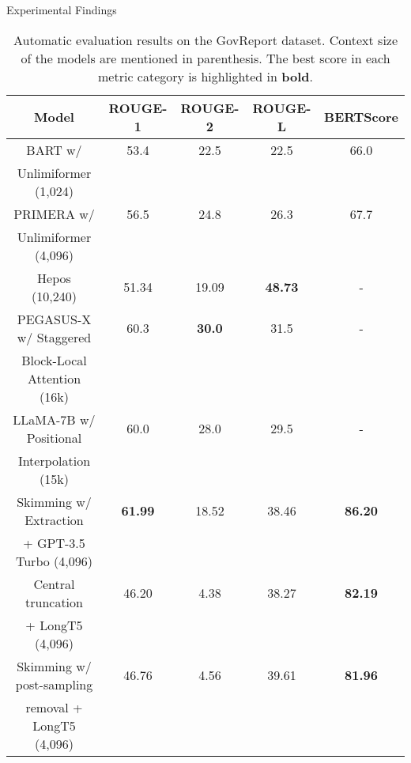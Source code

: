 \begin{frame}{Experimental Findings}

	\begin{table}[!ht]
		\centering
		\tiny
	
		\begin{tabular}{c c c c c}
			\hline
			Model & ROUGE-1 & ROUGE-2 & ROUGE-L & BERTScore \\
			\hline
			BART w/ & 53.4 & 22.5 & 22.5 & 66.0 \\
			Unlimiformer (1,024) & & & & \\
			PRIMERA w/ & 56.5 & 24.8 & 26.3 & 67.7 \\
			Unlimiformer (4,096) & & & & \\
			Hepos (10,240) & 51.34 & 19.09 & \textbf{48.73} & - \\
			PEGASUS-X w/ Staggered & 60.3 & \textbf{30.0} & 31.5 & - \\
			Block-Local Attention (16k) & & & & \\
			LLaMA-7B w/ Positional & 60.0 & 28.0 & 29.5 & - \\
			Interpolation (15k) & & & & \\
			\hline
			Skimming w/ Extraction & \textbf{61.99} & 18.52 & 38.46 & \textbf{86.20} \\
			+ GPT-3.5 Turbo (4,096) & & & & \\
			Central truncation & 46.20 & 4.38 & 38.27 & \textbf{82.19} \\
			+ LongT5 (4,096) & & & & \\
			Skimming w/ post-sampling & 46.76 & 4.56 & 39.61 & \textbf{81.96} \\
			removal + LongT5 (4,096) & & & & \\
			\hline
		\end{tabular}
	
		\caption{Automatic evaluation results on the GovReport dataset. Context size of
		the models are mentioned in parenthesis. The best score in each metric category
		is highlighted in \textbf{bold}.}
	\end{table}
	
\end{frame}

